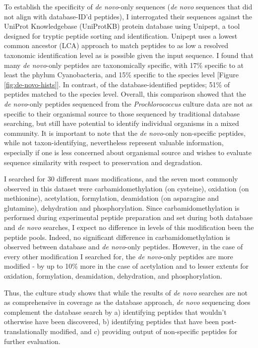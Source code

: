 \documentclass[12pt, letterpaper, twoside]{article}
\begin{document}
To establish the specificity of \textit{de novo}-only sequences (\textit{de novo} sequences that did not align with database-ID'd peptides), I interrogated their sequences against the UniProt Knowledgebase (UniProtKB) protein database using Unipept, a tool designed for tryptic peptide sorting and identification. Unipept uses a lowest common ancestor (LCA) approach to match peptides to as low a resolved taxonomic identification level as is possible given the input sequence. I found that many \textit{de novo}-only peptides are taxonomically specific, with 17\% specific to at least the phylum Cyanobacteria, and 15\% specific to the species level [Figure \ref{fig:de-novo-hists}]. In contrast, of the database-identified peptides; 51\% of peptides matched to the species level. Overall, this comparison showed that the \textit{de novo}-only peptides sequenced from the \textit{Prochlorococcus} culture data are not as specific to their organismal source to those sequenced by traditional database searching, but still have potential to identify individual organisms in a mixed community.  It is important to note that the \textit{de novo}-only non-specific peptides, while not taxon-identifying, nevertheless represent valuable information, especially if one is less concerned about organismal source and wishes to evaluate sequence similarity with respect to preservation and degradation.  

I searched for 30 different mass modifications, and the seven most commonly observed in this dataset were carbamidomethylation (on cysteine), oxidation (on methionine), acetylation, formylation, deamidation (on asparagine and glutamine), dehydration and phosphorylation. Since carbamidomethylation is performed during experimental peptide preparation and set during both database and \textit{de novo} searches, I expect no difference in levels of this modification been the peptide pools. Indeed, no significant difference in carbamidomethylation is observed between database and \textit{de novo}-only peptides. However, in the case of every other modification I searched for, the \textit{de novo}-only peptides are more modified - by up to 10\% more in the case of acetylation and to lesser extents for oxidation, formylation, deamidation, dehydration, and phosphorylation. 

Thus, the culture study shows that while the results of \textit{de novo} searches are not as comprehensive in coverage as the database approach, \textit{de novo} sequencing does complement the database search by a) identifying peptides that wouldn’t otherwise have been discovered, b) identifying peptides that have been post-translationally modified, and c) providing output of non-specific peptides for further evaluation. 
\end{document}
